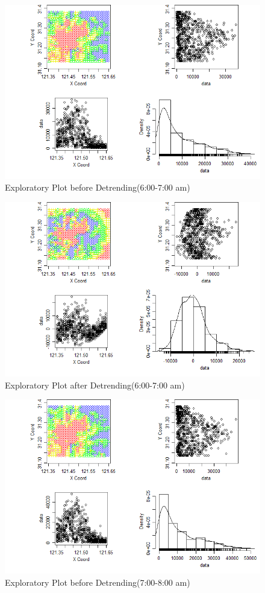 \documentclass[hidelinks,12pt]{article}
\begin{document}
\FloatBarrier
	\begin{figure}[!ht]
	\includegraphics[width=\textwidth]{geo6.png}
	\caption{Exploratory Plot before Detrending(6:00-7:00 am) \label{fig:geo6}}
\end{figure}
\FloatBarrier
\begin{figure}[!ht]
	\includegraphics[width=\textwidth]{gres6.png}
	\caption{Exploratory Plot after Detrending(6:00-7:00 am)\label{fig:gres6}}
\end{figure}
\FloatBarrier
\begin{figure}[!ht]
	\includegraphics[width=\textwidth]{geo7.png}
	\caption{Exploratory Plot before Detrending(7:00-8:00 am) \label{fig:geo7}}
\end{figure}
\end{document}
